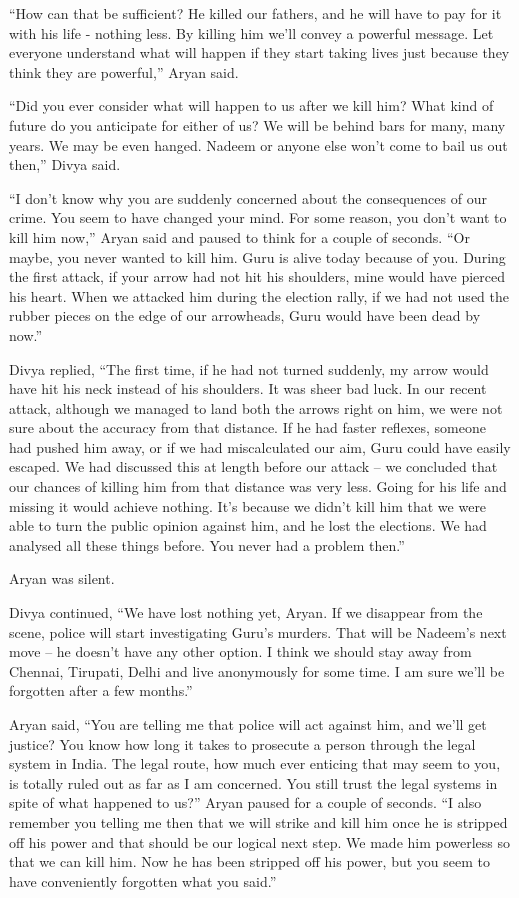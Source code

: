 “How can that be sufficient? He killed our fathers, and he will have to pay for
it with his life - nothing less. By killing him we'll convey a powerful message.
Let everyone understand what will happen if they start taking lives just because
they think they are powerful,” Aryan said.

“Did you ever consider what will happen to us after we kill him? What kind of
future do you anticipate for either of us? We will be behind bars for many, many
years. We may be even hanged. Nadeem or anyone else won't come to bail us out
then,” Divya said.

“I don't know why you are suddenly concerned about the consequences of our
crime. You seem to have changed your mind. For some reason, you don't want to
kill him now,” Aryan said and paused to think for a couple of seconds. “Or
maybe, you never wanted to kill him. Guru is alive today because of you. During
the first attack, if your arrow had not hit his shoulders, mine would have
pierced his heart. When we attacked him during the election rally, if we had not
used the rubber pieces on the edge of our arrowheads, Guru would have been dead
by now.”

Divya replied, “The first time, if he had not turned suddenly, my arrow would
have hit his neck instead of his shoulders. It was sheer bad luck. In our recent
attack, although we managed to land both the arrows right on him, we were not
sure about the accuracy from that distance. If he had faster reflexes, someone
had pushed him away, or if we had miscalculated our aim, Guru could have easily
escaped. We had discussed this at length before our attack – we concluded
that our chances of killing him from that distance was very less. Going for his
life and missing it would achieve nothing. It's because we didn't kill him that
we were able to turn the public opinion against him, and he lost the elections.
We had analysed all these things before. You never had a problem then.”

Aryan was silent.

Divya continued, “We have lost nothing yet, Aryan. If we disappear from the
scene, police will start investigating Guru's murders. That will be Nadeem's
next move – he doesn't have any other option. I think we should stay away from
Chennai, Tirupati, Delhi and live anonymously for some time. I am sure we'll be
forgotten after a few months.”

Aryan said, “You are telling me that police will act against him, and we'll get
justice? You know how long it takes to prosecute a person through the legal
system in India. The legal route, how much ever enticing that may seem to you,
is totally ruled out as far as I am concerned. You still trust the legal systems
in spite of what happened to us?” Aryan paused for a couple of seconds. “I also
remember you telling me then that we will strike and kill him once he is
stripped off his power and that should be our logical next step. We made him
powerless so that we can kill him. Now he has been stripped off his power, but
you seem to have conveniently forgotten what you said.”

